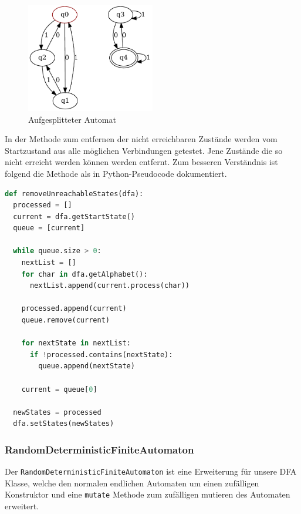 \begin{figure}[H]
  \centering
  \includegraphics[width=0.5\textwidth]{images/split_automaton.pdf}
  \caption[Aufgesplitteter Automat]{Aufgesplitteter Automat}
  \label{fig:split_dfa}
\end{figure}

In der Methode zum entfernen der nicht erreichbaren Zustände werden vom Startzustand aus alle möglichen Verbindungen getestet. Jene Zustände die so nicht erreicht werden können werden entfernt. Zum besseren Verständnis ist folgend die Methode als in Python-Pseudocode dokumentiert.  

\begin{lstlisting}[language=Python, caption={Algorithmus zum entfernen von nicht erreichbaren Zuständen}, label={lst:remove_unreachable_states}]
def removeUnreachableStates(dfa):
  processed = []
  current = dfa.getStartState()
  queue = [current]
  
  while queue.size > 0:
    nextList = []
    for char in dfa.getAlphabet():
      nextList.append(current.process(char))

    processed.append(current)
    queue.remove(current)

    for nextState in nextList:
      if !processed.contains(nextState):
        queue.append(nextState)

    current = queue[0]

  newStates = processed
  dfa.setStates(newStates)
\end{lstlisting}

\subsubsection{RandomDeterministicFiniteAutomaton}
\label{subsec:RandomDeterministicFiniteAutomaton}
Der \lstinline$RandomDeterministicFiniteAutomaton$ ist eine Erweiterung für unsere DFA Klasse, welche den normalen endlichen Automaten um einen zufälligen Konstruktor und eine \lstinline$mutate$ Methode zum zufälligen mutieren des Automaten erweitert.

